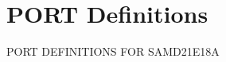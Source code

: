 \hypertarget{group___s_a_m_d21_e18_a__port}{}\section{P\+O\+RT Definitions}
\label{group___s_a_m_d21_e18_a__port}
P\+O\+RT D\+E\+F\+I\+N\+I\+T\+I\+O\+NS F\+OR S\+A\+M\+D21\+E18A 